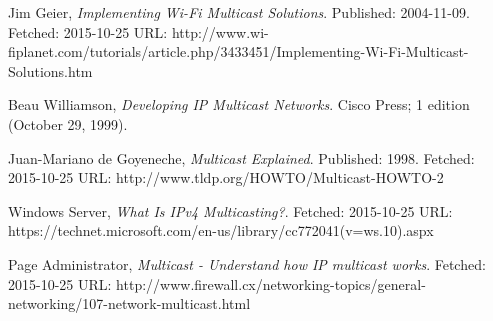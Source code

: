 \documentclass[9pt,a4paper]{acmproc}
\begin{document}
\begin{thebibliography}{9}

  Jim Geier,
  \emph{Implementing Wi-Fi Multicast Solutions}.
  \newline
  Published: 2004-11-09. Fetched: 2015-10-25 \newline
  URL: http://www.wi-fiplanet.com/tutorials/article.php/3433451/Implementing-Wi-Fi-Multicast-Solutions.htm
  
	Beau Williamson,
	\emph{Developing IP Multicast Networks}.
	\newline
Cisco Press; 1 edition (October 29, 1999).

  Juan-Mariano de Goyeneche,
  \emph{Multicast Explained}.
  \newline
  Published: 1998. Fetched: 2015-10-25 \newline
  URL: http://www.tldp.org/HOWTO/Multicast-HOWTO-2
  
  Windows Server,
  \emph{What Is IPv4 Multicasting?}.
  \newline
  Fetched: 2015-10-25 \newline
  URL: https://technet.microsoft.com/en-us/library/cc772041(v=ws.10).aspx
  
  Page Administrator,
  \emph{Multicast - Understand how IP multicast works}.
  \newline
  Fetched: 2015-10-25 \newline
  URL: http://www.firewall.cx/networking-topics/general-networking/107-network-multicast.html
  
  
  



\end{thebibliography}
\end{document}
